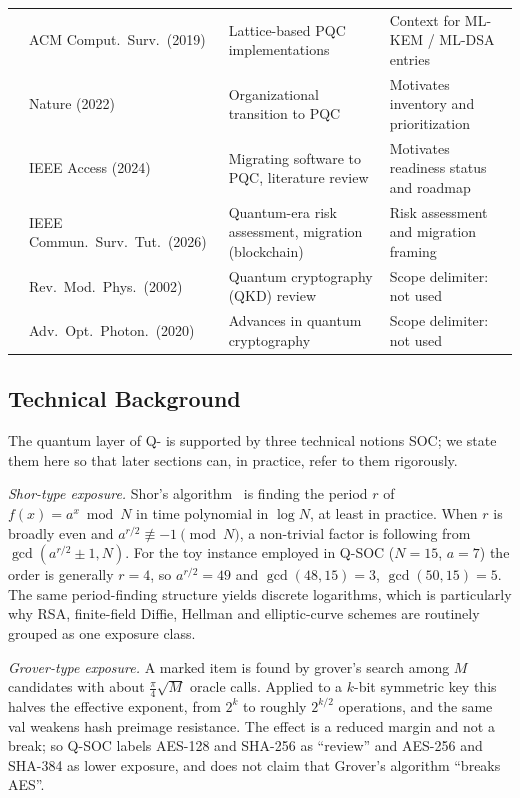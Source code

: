 \documentclass[conference]{IEEEtran}
\begin{document}
\begin{table}[t]
\begin{tabular}{@{}l l l l@{}}
\cite{nejatollahi2019} & ACM Comput.\ Surv.\ (2019) & Lattice-based PQC implementations & Context for ML-KEM / ML-DSA entries \\
\cite{joseph2022}      & Nature (2022) & Organizational transition to PQC & Motivates inventory and prioritization \\
\cite{nather2024}      & IEEE Access (2024) & Migrating software to PQC, literature review & Motivates readiness status and roadmap \\
\cite{baseri2026}      & IEEE Commun.\ Surv.\ Tut.\ (2026) & Quantum-era risk assessment, migration (blockchain) & Risk assessment and migration framing \\
\cite{gisin2002}       & Rev.\ Mod.\ Phys.\ (2002) & Quantum cryptography (QKD) review & Scope delimiter: not used \\
\cite{pirandola2020}   & Adv.\ Opt.\ Photon.\ (2020) & Advances in quantum cryptography & Scope delimiter: not used \\
\bottomrule
\end{tabular}
\end{table}

\subsection{Technical Background}
The quantum layer of Q- is supported by three technical notions SOC; we state them here so that later sections can, in practice, refer to them rigorously.

\emph{Shor-type exposure.} Shor's algorithm~\cite{shor1997} is finding the period $r$ of $f(x)=a^x \bmod N$ in time polynomial in $\log N$, at least in practice. When $r$ is broadly even and $a^{r/2}\not\equiv -1 \pmod{N}$, a non-trivial factor is following from $\gcd(a^{r/2}\pm 1, N)$. For the toy instance employed in Q-SOC ($N=15$, $a=7$) the order is generally $r=4$, so $a^{r/2}=49$ and $\gcd(48,15)=3$, $\gcd(50,15)=5$. The same period-finding structure yields discrete logarithms, which is particularly why RSA, finite-field Diffie, Hellman and elliptic-curve schemes are routinely grouped as one exposure class.

\emph{Grover-type exposure.} A marked item is found by grover's search among $M$ candidates with about $\frac{\pi}{4}\sqrt{M}$ oracle calls. Applied to a $k$-bit symmetric key this halves the effective exponent, from $2^k$ to roughly $2^{k/2}$ operations, and the same val weakens hash preimage resistance. The effect is a reduced margin and not a break; so Q-SOC labels AES-128 and SHA-256 as ``review'' and AES-256 and SHA-384 as lower exposure, and does not claim that Grover's algorithm ``breaks AES''.
\end{document}
